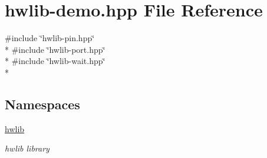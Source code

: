 \hypertarget{hwlib-demo_8hpp}{}\section{hwlib-\/demo.hpp File Reference}
\label{hwlib-demo_8hpp}
{\ttfamily \#include \char`\"{}hwlib-\/pin.\+hpp\char`\"{}}\\*
{\ttfamily \#include \char`\"{}hwlib-\/port.\+hpp\char`\"{}}\\*
{\ttfamily \#include \char`\"{}hwlib-\/wait.\+hpp\char`\"{}}\\*
\subsection*{Namespaces}
\begin{DoxyCompactItemize}
\item 
 \hyperlink{namespacehwlib}{hwlib}
\begin{DoxyCompactList}\small\item\em hwlib library \end{DoxyCompactList}\end{DoxyCompactItemize}
